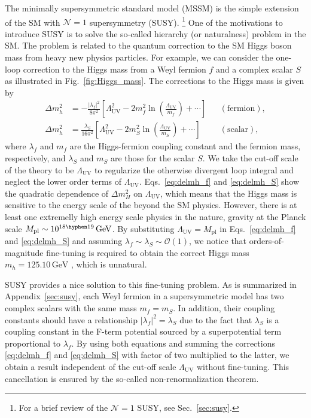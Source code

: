 \documentclass[12pt,twoside,book]{article}
\begin{document}
The minimally supersymmetric standard model (MSSM) is the simple extension of the SM with $\mathcal{N} = 1$ supersymmetry (SUSY). \footnote{
  For a brief review of the $\mathcal{N} = 1$ SUSY, see Sec.~\ref{sec:susy}.
}
One of the motivations to introduce SUSY is to solve the so-called hierarchy (or naturalness) problem \cite{Weinberg:1975gm,Gildener:1976ai,Susskind:1978ms} in the SM.
The problem is related to the quantum correction to the SM Higgs boson mass from heavy new physics particles.
For example, we can consider the one-loop correction to the Higgs mass from a Weyl fermion $f$ and a complex scalar $S$ as illustrated in Fig.~\ref{fig:Higgs_mass}.
The corrections to the Higgs mass is given by
\begin{align}
  \Delta m_h^2 &= -\frac{|\lambda_f|^2}{8 \pi^2} \left[
  \Lambda_{\mathrm{UV}}^2 - 2 m_f^2 \ln \left( \frac{\Lambda_{\mathrm{UV}}}{m_f} \right)
  + \cdots \right] & &\mathrm{(fermion)}, \label{eq:delmh_f}\\
  \Delta m_h^2 &= \frac{\lambda_S}{16 \pi^2} \left[
  \Lambda_{\mathrm{UV}}^2 - 2 m_S^2 \ln \left( \frac{\Lambda_{\mathrm{UV}}}{m_S} \right)
  + \cdots \right] & &\mathrm{(scalar)}, \label{eq:delmh_S}
\end{align}
where $\lambda_f$ and $m_f$ are the Higgs-fermion coupling constant and the fermion mass, respectively, and $\lambda_S$ and $m_S$ are those for the scalar $S$.
We take the cut-off scale of the theory to be $\Lambda_{\mathrm{UV}}$ to regularize the otherwise divergent loop integral and neglect the lower order terms of $\Lambda_{\mathrm{UV}}$.
Eqs.~\eqref{eq:delmh_f} and \eqref{eq:delmh_S} show the quadratic dependence of $\Delta m_H^2$ on $\Lambda_{\mathrm{UV}}$, which means that the Higgs mass is sensitive to the energy scale of the beyond the SM physics.
However, there is at least one extremelly high energy scale physics in the nature, gravity at the Planck scale $M_{\mathrm{pl}} \sim 10^{18 \hyphen 19}\,\mathrm{GeV}$.
By substituting $\Lambda_{\mathrm{UV}} = M_{\mathrm{pl}}$ in Eqs.~\eqref{eq:delmh_f} and \eqref{eq:delmh_S} and assuming $\lambda_f \sim \lambda_S \sim \mathcal{O} (1)$, we notice that orders-of-magnitude fine-tuning is required to obtain the correct Higgs mass $m_h = 125.10\,\mathrm{GeV}$ \cite{Tanabashi:2018oca}, which is unnatural.

SUSY provides a nice solution to this fine-tuning problem.
As is summarized in Appendix~\ref{sec:susy},  each Weyl fermion in a supersymmetric model has two complex scalars with the same mass $m_f = m_S$.
In addition, their coupling constants should have a relationship $|\lambda_f|^2 = \lambda_S$ due to the fact that $\lambda_S$ is a coupling constant in the F-term potential sourced by a superpotential term proportional to $\lambda_f$. 
By using both equations and summing the corrections \eqref{eq:delmh_f} and \eqref{eq:delmh_S} with factor of two multiplied to the latter, we obtain a result independent of the cut-off scale $\Lambda_{\mathrm{UV}}$ without fine-tuning.
This cancellation is ensured by the so-called non-renormalization theorem. \cite{Salam:1974jj, Grisaru:1979wc}
\end{document}
